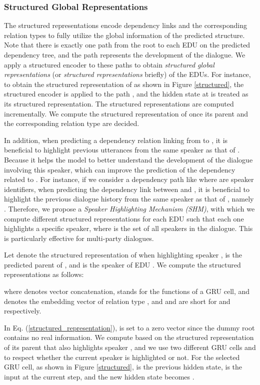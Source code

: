 \documentclass[letterpaper]{article} \usepackage{aaai19}  \usepackage{times}  \usepackage{helvet}  \usepackage{courier}  \usepackage{url}  \usepackage{graphicx}  \usepackage{amssymb}
\begin{document}
\subsubsection{Structured Global Representations}

\noindent The structured representations encode dependency links and the corresponding relation types to fully utilize the global information of the predicted structure.
Note that there is exactly one path from the root to each EDU on the predicted dependency tree, and the path represents the development of the dialogue.
We apply a structured encoder to these paths to obtain \emph{structured global representations} (or \emph{structured representations} briefly) of the EDUs.
For instance, to obtain the structured representation of  as shown in Figure \ref{structured}, the structured encoder is applied to the path , and the hidden state at  is treated as its structured representation.
The structured representations are computed incrementally. We compute the structured representation of  once its parent and the corresponding relation type are decided.

In addition, when predicting a dependency relation linking from  to , it is beneficial to highlight previous utterances from the same speaker as that of . Because it helps the model to better understand the development of the dialogue involving this speaker, which can improve the prediction of the dependency related to . 
For instance, if we consider a dependency path like  where  are speaker identifiers, when predicting the dependency link between  and , it is beneficial to highlight the previous dialogue history  from the same speaker as that of , namely .
Therefore, we propose a \emph{Speaker Highlighting Mechanism (SHM)}, with which we compute  different structured representations for each EDU such that each one highlights a specific speaker, where  is the set of all speakers in the dialogue.
This is particularly effective for multi-party dialogues.

Let  denote the structured representation of  when highlighting speaker ,  is the predicted parent of , and  is the speaker of EDU . 
We compute the structured representations as follows:

where  denotes vector concatenation,  stands for the functions of a GRU cell, and  denotes the embedding vector of relation type , and  and  are short for  and  respectively.

In Eq. (\ref{structured_representation}),  is set to a zero vector since the dummy root contains no real information. We compute  based on the structured representation of its parent  that also highlights speaker , and we use two different GRU cells  and  to respect whether the current speaker  is highlighted or not. For the selected GRU cell, as shown in Figure \ref{structured},  is the previous hidden state,  is the input at the current step, and the new hidden state becomes .
\end{document}
